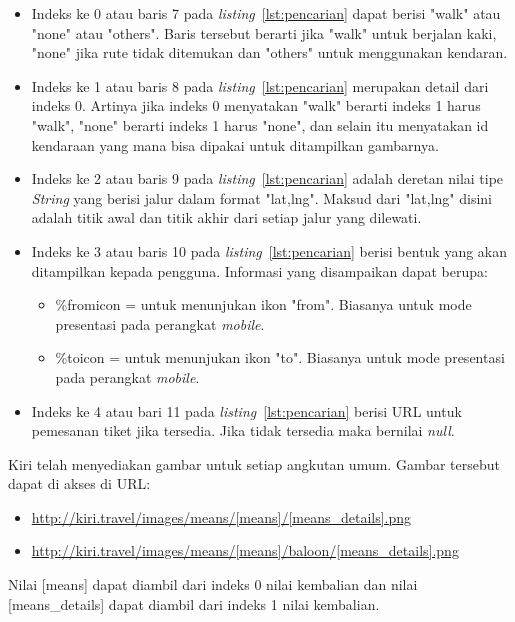 \begin{itemize}
	\item Indeks ke 0 atau baris 7 pada \textit{listing}~\ref{lst:pencarian} dapat berisi "walk" atau "none" atau "others". Baris tersebut berarti jika "walk" untuk berjalan kaki, "none" jika rute tidak ditemukan dan "others" untuk menggunakan kendaran.
	\item Indeks ke 1 atau baris 8 pada \textit{listing}~\ref{lst:pencarian} merupakan detail dari indeks 0. Artinya jika indeks 0 menyatakan "walk" berarti indeks 1 harus "walk", "none" berarti indeks 1 harus "none", dan selain itu menyatakan id kendaraan yang mana bisa dipakai untuk ditampilkan gambarnya.
	\item Indeks ke 2 atau baris 9 pada \textit{listing}~\ref{lst:pencarian} adalah deretan nilai tipe \textit{String} yang berisi jalur dalam format "lat,lng". Maksud dari "lat,lng" disini adalah titik awal dan titik akhir dari setiap jalur yang dilewati.
	\item Indeks ke 3 atau baris 10 pada \textit{listing}~\ref{lst:pencarian} berisi bentuk yang akan ditampilkan kepada pengguna. Informasi yang disampaikan dapat berupa:
		\begin{itemize}
			\item \%fromicon = untuk menunjukan ikon "from". Biasanya untuk mode presentasi pada perangkat \textit{mobile}.
			\item \%toicon = untuk menunjukan ikon "to". Biasanya untuk mode presentasi pada perangkat \textit{mobile}. 
		\end{itemize}
	\item Indeks ke 4 atau bari 11 pada \textit{listing}~\ref{lst:pencarian} berisi URL untuk pemesanan tiket jika tersedia. Jika tidak tersedia maka bernilai \textit{null}.
\end{itemize}

\hspace{0.5cm} Kiri telah menyediakan gambar untuk setiap angkutan umum. Gambar tersebut dapat di akses di URL:
\begin{itemize}
	\item \url{http://kiri.travel/images/means/[means]/[means_details].png}
	\item \url{http://kiri.travel/images/means/[means]/baloon/[means_details].png}
\end{itemize}
Nilai [means] dapat diambil dari indeks 0 nilai kembalian dan nilai [means\_details] dapat diambil dari indeks 1 nilai kembalian. 
		
